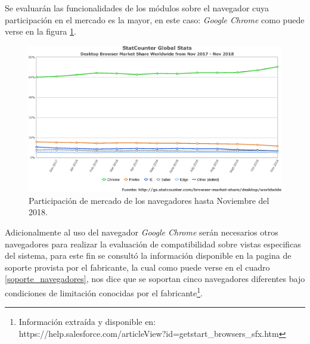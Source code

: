 Se evaluarán las funcionalidades de los módulos sobre el navegador cuya
participación en el mercado es la mayor, en este caso: \emph{Google Chrome}
como puede verse en la figura \ref{software}.

\begin{figure}
\centering
\includegraphics[width=1.0\textwidth]{graphics/compatibilidad.eps}
\caption{Participación de mercado de los navegadores hasta Noviembre del 2018.}
\label{software}
\end{figure}

Adicionalmente al uso del navegador \emph{Google Chrome} serán necesarios
otros navegadores para realizar la evaluación de compatibilidad sobre
vistas especificas del sistema, para este fin se consultó la información
disponible en la pagina de soporte provista por el fabricante, la cual como
puede verse en el cuadro \ref{soporte_navegadores}, nos dice que se soportan
cinco navegadores diferentes bajo condiciones de limitación conocidas por el
fabricante\footnote{Información extraída y disponible en:
https://help.salesforce.com/articleView?id=getstart\_browsers\_sfx.htm}.

